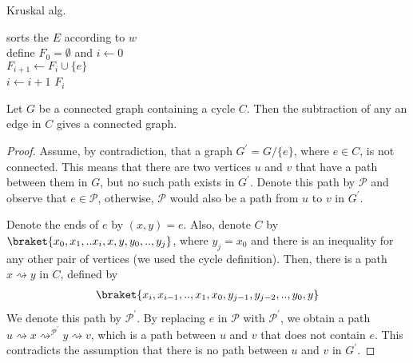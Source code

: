 \begin{algorithm}
\SetAlgoLined
{}
\caption{ Kruskal alg.}
sorts the $E$ according to $w$ \\
define $F_{0} = \emptyset$ and $i \leftarrow 0$ \\
 {
   {
    $F_{i+1} \leftarrow F_{i} \cup \{e\}$ \\
    $i \leftarrow i + 1$
  }
}
\Return $F_{i}$
\end{algorithm}


\begin{claim}
  \label{claim:subtract}
  Let $G$ be a connected graph containing a cycle $C$. Then the subtraction of any an edge in $C$ gives a connected graph. 
\end{claim}
\begin{proof}
Assume, by contradiction, that a graph $G^{\prime} = G / \{ e \} $, where $e \in C$, is not connected. This means that there are two vertices $u$ and $v$ that have a path between them in $G$, but no such path exists in $G^{\prime}$. Denote this path by $\mathcal{P}$ and observe that $e \in \mathcal{P}$, otherwise, $\mathcal{P}$ would also be a path from $u$ to $v$ in $G^{\prime}$.

Denote the ends of $e$ by $(x,y)=e$. Also, denote $C$ by $\braket{x_{0},x_{1},..x_{i},x,y,y_{0},..,y_{j}}$, where $y_{j}=x_{0}$ and there is an inequality for any other pair of vertices (we used the cycle definition). Then, there is a path $x \rightsquigarrow y$ in $C$, defined by 
\begin{equation*}
  \begin{split}
\braket{x_{i},x_{i-1},..,x_{1},x_{0},y_{j-1},y_{j-2},..,y_{0},y}
  \end{split}
\end{equation*}
 We denote this path by $\mathcal{P}^{\prime}$. By replacing $e$ in $\mathcal{P}$ with $\mathcal{P}^{\prime}$, we obtain a path $u \rightsquigarrow x \rightsquigarrow^{\mathcal{P}^\prime} y \rightsquigarrow v$, which is a path between $u$ and $v$ that does not contain $e$. This contradicts the assumption that there is no path between $u$ and $v$ in $G^{\prime}$.
\end{proof}






